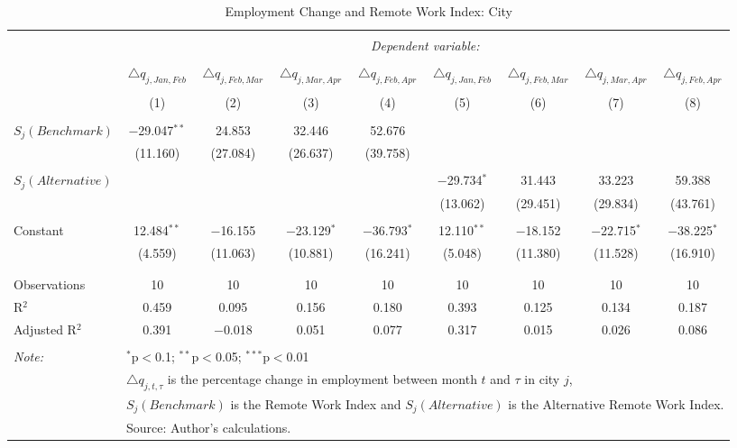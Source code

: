
\begin{table}[!htbp] \centering 
  \caption{Employment Change and Remote Work Index: City} 
  \label{tab:regression_dynamics_city} 
\footnotesize 
\begin{tabular}{@{\extracolsep{5pt}}lcccccccc} 
\\[-1.8ex]\hline 
\hline \\[-1.8ex] 
 & \multicolumn{8}{c}{\textit{Dependent variable:}} \\ 
\cline{2-9} 
\\[-1.8ex] & $\triangle q_{j,Jan,Feb}$ & $\triangle q_{j,Feb,Mar}$ & $\triangle q_{j,Mar,Apr}$ & $\triangle q_{j,Feb,Apr}$ & $\triangle q_{j,Jan,Feb}$ & $\triangle q_{j,Feb,Mar}$ & $\triangle q_{j,Mar,Apr}$ & $\triangle q_{j,Feb,Apr}$ \\ 
\\[-1.8ex] & (1) & (2) & (3) & (4) & (5) & (6) & (7) & (8)\\ 
\hline \\[-1.8ex] 
 $S_{j}(Benchmark)$ & $-$29.047$^{**}$ & 24.853 & 32.446 & 52.676 &  &  &  &  \\ 
  & (11.160) & (27.084) & (26.637) & (39.758) &  &  &  &  \\ 
  & & & & & & & & \\ 
 $S_{j}(Alternative)$ &  &  &  &  & $-$29.734$^{*}$ & 31.443 & 33.223 & 59.388 \\ 
  &  &  &  &  & (13.062) & (29.451) & (29.834) & (43.761) \\ 
  & & & & & & & & \\ 
 Constant & 12.484$^{**}$ & $-$16.155 & $-$23.129$^{*}$ & $-$36.793$^{*}$ & 12.110$^{**}$ & $-$18.152 & $-$22.715$^{*}$ & $-$38.225$^{*}$ \\ 
  & (4.559) & (11.063) & (10.881) & (16.241) & (5.048) & (11.380) & (11.528) & (16.910) \\ 
  & & & & & & & & \\ 
\hline \\[-1.8ex] 
Observations & 10 & 10 & 10 & 10 & 10 & 10 & 10 & 10 \\ 
R$^{2}$ & 0.459 & 0.095 & 0.156 & 0.180 & 0.393 & 0.125 & 0.134 & 0.187 \\ 
Adjusted R$^{2}$ & 0.391 & $-$0.018 & 0.051 & 0.077 & 0.317 & 0.015 & 0.026 & 0.086 \\ 
\hline 
\hline \\[-1.8ex] 
\textit{Note:}  & \multicolumn{8}{l}{$^{*}$p$<$0.1; $^{**}$p$<$0.05; $^{***}$p$<$0.01} \\ 
 & \multicolumn{8}{l}{$\triangle q_{j,t,\tau}$ is the percentage change in employment between month $t$ and $\tau$ in city $j$,} \\ 
 & \multicolumn{8}{l}{$S_{j} (Benchmark)$ is the Remote Work Index and $S_{j} (Alternative)$ is the Alternative Remote Work Index.} \\ 
 & \multicolumn{8}{l}{Source: Author's calculations.} \\ 
\end{tabular} 
\end{table} 
